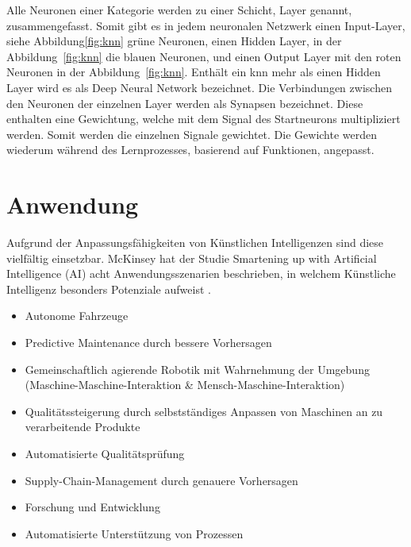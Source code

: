 \bigskip

Alle Neuronen einer Kategorie werden zu einer Schicht, Layer genannt, zusammengefasst. Somit gibt es in jedem neuronalen Netzwerk einen Input-Layer, siehe Abbildung\ref{fig:knn} grüne Neuronen, einen Hidden Layer, in der Abbildung~\ref{fig:knn} die blauen Neuronen, und einen Output Layer mit den roten Neuronen in der Abbildung~\ref{fig:knn}. Enthält ein \ac{knn} mehr als einen Hidden Layer wird es als Deep Neural Network bezeichnet. Die Verbindungen zwischen den  Neuronen der einzelnen Layer werden als Synapsen bezeichnet. Diese enthalten eine Gewichtung, welche mit dem Signal des Startneurons multipliziert werden. Somit werden die einzelnen Signale gewichtet. Die Gewichte werden wiederum während des Lernprozesses, basierend auf Funktionen, angepasst.


\section{Anwendung}

Aufgrund der Anpassungsfähigkeiten von Künstlichen Intelligenzen sind diese vielfältig einsetzbar. McKinsey hat der Studie \glqq Smartening up with Artificial Intelligence (AI)\grqq{} acht Anwendungsszenarien beschrieben, in welchem Künstliche Intelligenz besonders Potenziale aufweist \cite{McKinsey:2017}.

\begin{itemize}
  \item Autonome Fahrzeuge
  \item Predictive Maintenance durch bessere Vorhersagen 
  \item Gemeinschaftlich agierende Robotik mit Wahrnehmung der Umgebung (Maschine-Maschine-Interaktion \& Mensch-Maschine-Interaktion)
  \item Qualitätssteigerung durch selbstständiges Anpassen von Maschinen an zu verarbeitende Produkte
  \item Automatisierte Qualitätsprüfung
  \item Supply-Chain-Management durch genauere Vorhersagen
  \item Forschung und Entwicklung
  \item Automatisierte Unterstützung von Prozessen
\end{itemize}




